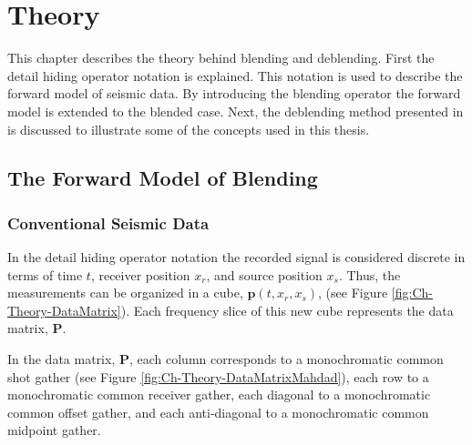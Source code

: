 \chapter{Theory} \label{chap:theory}

This chapter describes the theory behind blending and deblending. First the detail hiding operator notation is explained. This notation is used to describe the forward model of seismic data. By introducing the blending operator the forward model is extended to the blended case. Next, the deblending method presented in \citet{Mahdad-Deblending-Method} is discussed to illustrate some of the concepts used in this thesis.

\section{The Forward Model of Blending} \label{sec:Ch-Theory-Operator}

\subsection{Conventional Seismic Data}
In the detail hiding operator notation \citep{Berkhout1982} the recorded signal is considered discrete in terms of time $t$, receiver position $x_r$, and source position $x_s$. Thus, the measurements can be organized in a cube, $\mathbf{p}(t,x_r,x_s)$, (see Figure \ref{fig:Ch-Theory-DataMatrix}). Each frequency slice of this new cube represents the data matrix, $\mathbf{P}$. 

In the data matrix, $\mathbf{P}$, each column corresponds to a monochromatic common shot gather (see Figure \ref{fig:Ch-Theory-DataMatrixMahdad}), each row to a monochromatic common receiver gather, each diagonal to a monochromatic common offset gather, and each anti-diagonal to a monochromatic common midpoint gather. 

